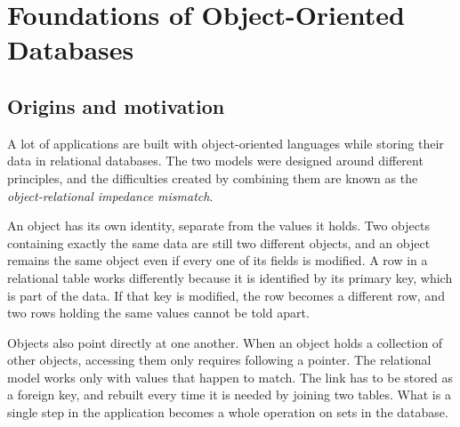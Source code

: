 \documentclass{article}
\begin{document}
\section{Foundations of Object-Oriented Databases}

\subsection{Origins and motivation}

A lot of applications are built with object-oriented languages while storing their data in relational databases. The two models were designed around different principles, and the difficulties created by combining them are known as the \emph{object-relational impedance mismatch}.

An object has its own identity, separate from the values it holds. Two objects containing exactly the same data are still two different objects, and an object remains the same object even if every one of its fields is modified. A row in a relational table works differently because it is identified by its primary key, which is part of the data. If that key is modified, the row becomes a different row, and two rows holding the same values cannot be told apart.

Objects also point directly at one another. When an object holds a collection of other objects, accessing them only requires following a pointer.
The relational model works only with values that happen to match. The link has to be stored as a foreign key, and rebuilt every time it is needed by joining two tables. What is a single step in the application becomes a whole operation on sets in the database.
\end{document}

